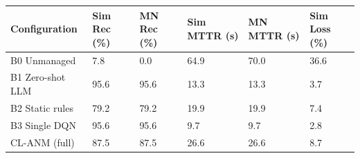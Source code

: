 \begin{tabular}{llllll}
\toprule
Configuration & Sim Rec (\%) & MN Rec (\%) & Sim MTTR (s) & MN MTTR (s) & Sim Loss (\%) \\
\midrule
B0 Unmanaged & 7.8 & 0.0 & 64.9 & 70.0 & 36.6 \\
B1 Zero-shot LLM & 95.6 & 95.6 & 13.3 & 13.3 & 3.7 \\
B2 Static rules & 79.2 & 79.2 & 19.9 & 19.9 & 7.4 \\
B3 Single DQN & 95.6 & 95.6 & 9.7 & 9.7 & 2.8 \\
CL-ANM (full) & 87.5 & 87.5 & 26.6 & 26.6 & 8.7 \\
\bottomrule
\end{tabular}
